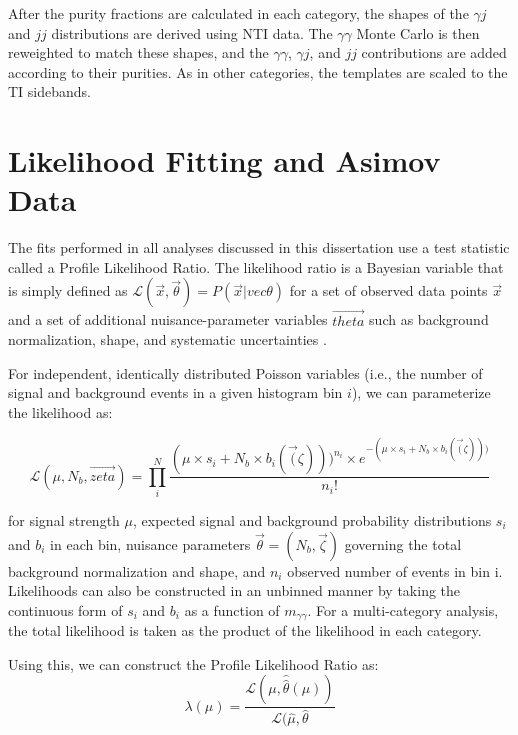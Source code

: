 After the purity fractions are calculated in each category, the shapes of the $\gamma j$ and $jj$ distributions are derived using NTI data. The $\gamma \gamma$ Monte Carlo is then reweighted to match these shapes, and the $\gamma \gamma$, $\gamma j$, and $jj$ contributions are added according to their purities. As in other categories, the templates are scaled to the TI sidebands. 

\section{Likelihood Fitting and Asimov Data} \label{sec:likelihoodfit} 

The fits performed in all analyses discussed in this dissertation use a test statistic called a Profile Likelihood Ratio. The likelihood ratio  is a Bayesian variable that is simply defined as $\mathcal{L}(\vec{x},\vec{\theta}) = P(\vec{x} | vec{\theta})$  for a set of observed data points $\vec{x}$ and a set of additional nuisance-parameter variables $\vec{theta}$ such as background normalization, shape, and systematic uncertainties \cite{Cowan}.

For independent, identically distributed Poisson variables (i.e., the number of signal and background events in a given histogram bin $i$), we can parameterize the likelihood as:

\begin{equation}
\mathcal{L}(\mu, N_{b}, \vec{zeta}) = \prod_{i}^{N}{\frac{(\mu \times s_{i}+ N_{b} \times b_{i}(\vec(\zeta)))^{n_{i}} \times e^{-(\mu \times s_{i}+ N_{b} \times b_{i}(\vec(\zeta))) }}{n_{i}!}}
\end{equation}

for signal strength $\mu$, expected signal and background probability distributions $s_{i}$ and $b_{i}$ in each bin, nuisance parameters $\vec{\theta} = (N_{b}, \vec{\zeta})$ governing the total background normalization and shape, and $n_{i}$ observed number of events in bin i. Likelihoods can also be constructed in an unbinned manner by taking the continuous form of $s_{i}$ and $b_{i}$ as a function of $m_{\gamma\gamma}$. For a multi-category analysis, the total likelihood is taken as the product of the likelihood in each category.

Using this, we can construct the Profile Likelihood Ratio as: 
\begin{equation}
\lambda(\mu) = \frac{\mathcal{L}(\mu, \hat{\hat{\theta}}(\mu))} {\mathcal{L}(\hat{\mu}, \hat{\theta}}
\end{equation}

